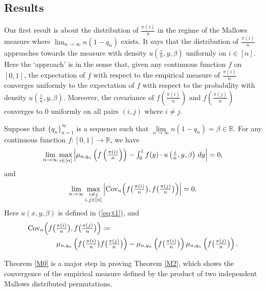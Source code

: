 \subsection{Results}

Our first result is about the distribution of $\frac{\pi(i)}{n}$ in the regime of the Mallows measure where $\lim_{n \to \infty}n(1-q_n)$ exists. It says that the distribution of 
$\frac{\pi(i)}{n}$ approaches towards the measure with density $u\left(\frac{i}{n}, y, \beta \right)$ uniformly on $i \in [n]$. Here the `approach' is in the sense that, given any continuous function $f$ on $[0, 1]$, the expectation of $f$ with respect to the empirical measure of $\frac{\pi(i)}{n}$ converges uniformly to the expectation of $f$ with respect to the probability with density $u\left(\frac{i}{n}, y, \beta \right)$. Moreover, the covariance of $f(\frac{\pi(i)}{n})$ and $f(\frac{\pi(j)}{n})$ converges to 0 uniformly on all pairs $(i, j)$ where $i \neq j$.

\begin{theorem}\label{M0}
Suppose that $\{q_n\}_{n=1}^{\infty}$ is a sequence such that $\lim\limits_{n\to\infty} n (1-q_n) = \beta \in \mathbb{R}$. For any continuous function $f : [0, 1] \longrightarrow \mathbb{R}$, we have
\begin{equation}\label{eq:M01}
\textstyle\lim\limits_{n \to \infty}\max\limits_{i \in [n]}
  \left| \mu_{n, q_n} \left( f\left(\frac{\pi(i)}{n}\right) \right) - \int_0^1 f(y)\cdot u\left(\frac{i}{n}, y, \beta \right)\, dy \right| = 0,
\end{equation}
and
\begin{equation}\label{eq:M02}
\textstyle\lim\limits_{n \to \infty}\max\limits_{\substack{ i \neq j\\
                                   i, j \in [n]}}
    \left| \text{Cov}_n\Big(f\big(\frac{\pi(i)}{n}\big), f\big(\frac{\pi(j)}{n}\big)\Big) \right| = 0.
\end{equation}
Here $u(x, y, \beta)$ is defined in (\ref{eq:t1}), and
\begin{align*}
&\textstyle\text{Cov}_n\Big(f\big(\frac{\pi(i)}{n}\big), f\big(\frac{\pi(j)}{n}\big)\Big) \coloneqq\\
&\textstyle\qquad\qquad \mu_{n, q_n} \left(f\big(\frac{\pi(i)}{n}\big)f\big(\frac{\pi(j)}{n}\big)\right) -
     \mu_{n, q_n} \left(f\big(\frac{\pi(i)}{n}\big)\right) \mu_{n, q_n} \left(f\big(\frac{\pi(j)}{n}\big)\right).
\end{align*}
\end{theorem}


Theorem \ref{M0} is a major step in proving Theorem \ref{M2}, which shows the convergence of the empirical measure defined by the product of two independent Mallows distributed permutations. 

